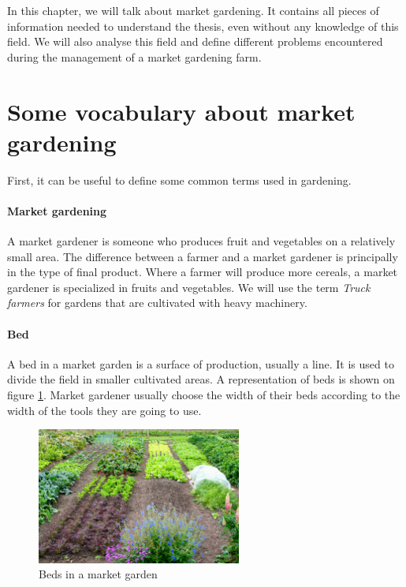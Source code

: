 
In this chapter, we will talk about market gardening. It contains all pieces of information needed to understand the thesis, even without any knowledge of this field. We will also analyse this field and define different problems encountered during the management of a market gardening farm.

\section{Some vocabulary about market gardening}
First, it can be useful to define some common terms used in gardening.
\paragraph{Market gardening} A market gardener is someone who produces fruit and vegetables on a relatively small area. The difference between a farmer and a market gardener is principally in the type of final product. Where a farmer will produce more cereals, a market gardener is specialized in fruits and vegetables. We will use the term \emph{Truck farmers} for gardens that are cultivated with heavy machinery.  


\paragraph{Bed} A bed in a market garden is a surface of production, usually a line. It is used to divide the field in smaller cultivated areas. A representation of beds is shown on figure \ref{fig:beds}. Market gardener usually choose the width of their beds according to the width of the tools they are going to use.

\begin{figure}
    \centering
    \includegraphics[width=0.6\textwidth]{images/beds.jpg}
    \caption{Beds in a market garden}
    \label{fig:beds}
\end{figure}

